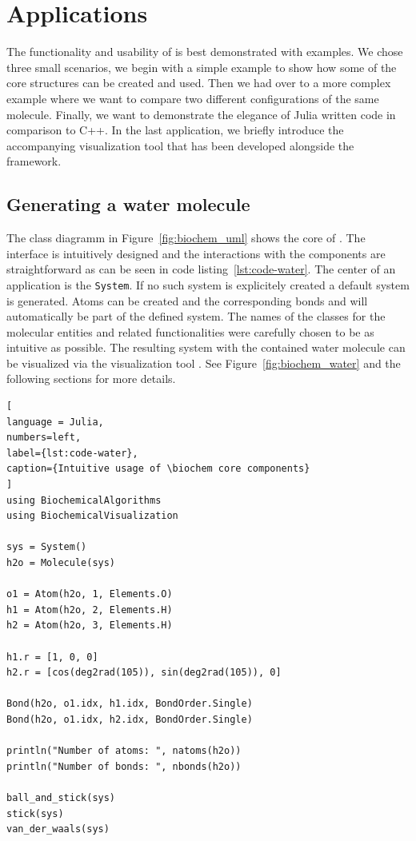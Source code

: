 \section{Applications}

The functionality and usability of \biochem is best demonstrated with examples. We chose three small scenarios, we begin with a simple example to show how some of the core structures can be created and used. Then we had over to a more complex example where we want to compare two different configurations of the same molecule. Finally, we want to demonstrate the elegance of Julia written code in comparison to C++. In the last application, we briefly introduce the accompanying visualization tool \bioviz that has been developed alongside the \biochem framework.

\subsection{Generating a water molecule}

The class diagramm in Figure~\ref{fig:biochem_uml} shows the core of \biochem. The interface is intuitively designed and the interactions with the components are straightforward as can be seen in code listing~\ref{lst:code-water}. The center of an application is the \texttt{System}. If no such system is explicitely created a default system is generated. Atoms can be created and the corresponding bonds and will automatically be part of the defined system. The names of the classes for the molecular entities and related functionalities were carefully chosen to be as intuitive as possible. The resulting system with the contained water molecule can be visualized via the visualization tool \bioviz. See Figure~\ref*{fig:biochem_water} and the following sections for more details. 
\begin{lstlisting}[
language = Julia, 
numbers=left, 
label={lst:code-water}, 
caption={Intuitive usage of \biochem core components}
]
using BiochemicalAlgorithms
using BiochemicalVisualization

sys = System() 
h2o = Molecule(sys)

o1 = Atom(h2o, 1, Elements.O)
h1 = Atom(h2o, 2, Elements.H)
h2 = Atom(h2o, 3, Elements.H)

h1.r = [1, 0, 0]
h2.r = [cos(deg2rad(105)), sin(deg2rad(105)), 0]

Bond(h2o, o1.idx, h1.idx, BondOrder.Single)
Bond(h2o, o1.idx, h2.idx, BondOrder.Single)

println("Number of atoms: ", natoms(h2o))
println("Number of bonds: ", nbonds(h2o))

ball_and_stick(sys)	
stick(sys)
van_der_waals(sys)
\end{lstlisting}


